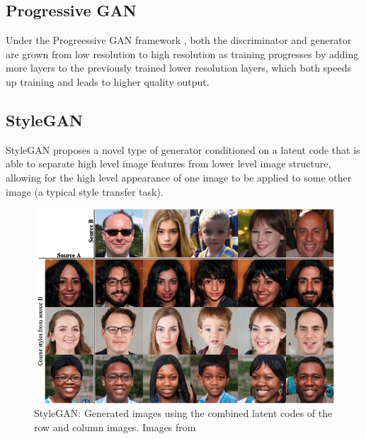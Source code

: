 \subsection{Progressive GAN}
Under the Progreessive GAN framework \cite{karras2017progressive}, both the discriminator and generator are grown from low resolution to high resolution as training progresses by adding more layers to the previously trained lower resolution layers, which both speeds up training and leads to higher quality output.

\subsection{StyleGAN}
StyleGAN \cite{karras2018stylebased} proposes a novel type of generator conditioned on a latent code that is able to separate high level image features from lower level image structure, allowing for the high level appearance of one image to be applied to some other image (a typical style transfer task).

\begin{figure}[h]
\centering
  \includegraphics[scale=0.5]{chapter_14/files/stylegan.png}
  \caption{StyleGAN: Generated images using the combined latent codes of the row and column images. Images from \cite{karras2018stylebased}}
\end{figure}